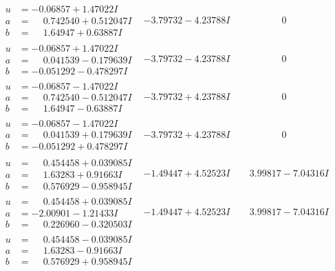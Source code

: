 \documentclass[1p]{elsarticle_modified}
\theoremstyle{definition}
\begin{document}
$$\begin{array}{c|c|c}
\begin{aligned}
u &= -0.06857 + 1.47022 I \\
a &= \phantom{-}0.742540 + 0.512047 I \\
b &= \phantom{-}1.64947 + 0.63887 I\end{aligned}
 & -3.79732 - 4.23788 I & \phantom{-0.000000 } 0 \\ \hline\begin{aligned}
u &= -0.06857 + 1.47022 I \\
a &= \phantom{-}0.041539 - 0.179639 I \\
b &= -0.051292 - 0.478297 I\end{aligned}
 & -3.79732 - 4.23788 I & \phantom{-0.000000 } 0 \\ \hline\begin{aligned}
u &= -0.06857 - 1.47022 I \\
a &= \phantom{-}0.742540 - 0.512047 I \\
b &= \phantom{-}1.64947 - 0.63887 I\end{aligned}
 & -3.79732 + 4.23788 I & \phantom{-0.000000 } 0 \\ \hline\begin{aligned}
u &= -0.06857 - 1.47022 I \\
a &= \phantom{-}0.041539 + 0.179639 I \\
b &= -0.051292 + 0.478297 I\end{aligned}
 & -3.79732 + 4.23788 I & \phantom{-0.000000 } 0 \\ \hline\begin{aligned}
u &= \phantom{-}0.454458 + 0.039085 I \\
a &= \phantom{-}1.63283 + 0.91663 I \\
b &= \phantom{-}0.576929 - 0.958945 I\end{aligned}
 & -1.49447 + 4.52523 I & \phantom{-}3.99817 - 7.04316 I \\ \hline\begin{aligned}
u &= \phantom{-}0.454458 + 0.039085 I \\
a &= -2.00901 - 1.21433 I \\
b &= \phantom{-}0.226960 - 0.320503 I\end{aligned}
 & -1.49447 + 4.52523 I & \phantom{-}3.99817 - 7.04316 I \\ \hline\begin{aligned}
u &= \phantom{-}0.454458 - 0.039085 I \\
a &= \phantom{-}1.63283 - 0.91663 I \\
b &= \phantom{-}0.576929 + 0.958945 I\end{aligned}

\end{array}$$
\end{document}

